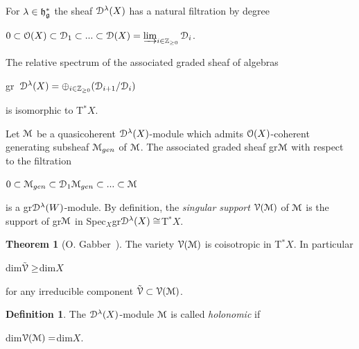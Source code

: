 \documentclass[12pt]{amsart}
\theoremstyle{definition}\newtheorem{theorem}{Theorem}[section]
\theoremstyle{definition}\newtheorem{definition}[proposition]{Definition}
\theoremstyle{remark}\newtheorem{example}[proposition]{Example}
\begin{document}
For $\lambda\in\frak h_\frak g^*$ the sheaf $\EuScript D^\lambda(X)$ has a natural filtration  by degree \begin{center}$0\subset\EuScript O(X)\subset \EuScript D_1\subset...\subset\EuScript D(X)=\varinjlim_{i\in\mathbb Z_{\ge0}}\EuScript D_i$.\end{center} The relative spectrum of the associated graded sheaf of algebras \begin{center}gr~$\EuScript D^\lambda(X)=\oplus_{i\in\mathbb Z_{\ge0}}(\EuScript D_{i+1}/\EuScript D_i)$\end{center} is isomorphic to T$^*X$.

Let $\EuScript M$ be a quasicoherent $\EuScript D^\lambda(X)$-module
which admits $\EuScript O(X)$-coherent generating subsheaf
$\EuScript M_{gen}$ of $\EuScript M$. The associated graded sheaf
gr$\EuScript M$ with respect to the filtration
\begin{center}$0\subset\EuScript M_{gen}\subset\EuScript
D_1\EuScript M_{gen}\subset...\subset\EuScript M$\end{center} is a
gr$\EuScript D^\lambda(W)$-module. By definition, the {\it singular
support} $\EuScript V(\EuScript M)$ of $\EuScript M$ is the support
of gr$\EuScript M$ in Spec$_X$gr$\EuScript D^\lambda(X)\cong$T$^*X$.
\begin{theorem}[O. Gabber~\cite{Gab}]\label{GabD} The variety $\EuScript V(\EuScript M)$ is coisotropic in T$^*X$. In particular \begin{center}dim$\tilde{\EuScript V}\ge$dim$X$\end{center} for any irreducible component $\tilde{\EuScript V}\subset\EuScript V(\EuScript M)$. \end{theorem}
\begin{definition} The $\EuScript D^\lambda(X)$-module $\EuScript M$ is called {\it holonomic} if \begin{center}dim$\EuScript V(\EuScript M)=$dim$X$.\end{center}\end{definition}
\end{document}
